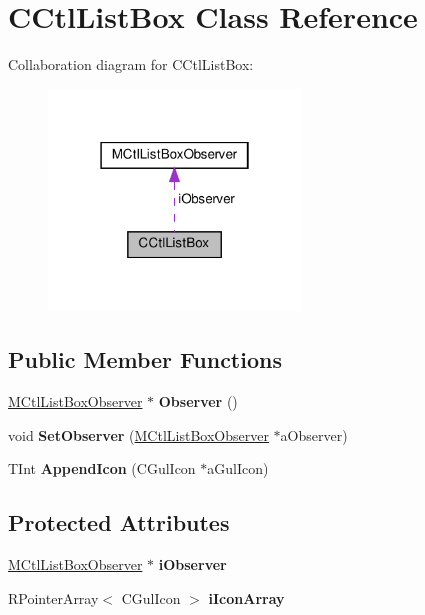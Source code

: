 \hypertarget{classCCtlListBox}{}\section{C\+Ctl\+List\+Box Class Reference}
\label{classCCtlListBox}


Collaboration diagram for C\+Ctl\+List\+Box\+:
\nopagebreak
\begin{figure}[H]
\begin{center}
\leavevmode
\includegraphics[width=190pt]{classCCtlListBox__coll__graph}
\end{center}
\end{figure}
\subsection*{Public Member Functions}
\begin{DoxyCompactItemize}
\item 
\mbox{\label{classCCtlListBox_a3d64c3d1fd6826c3a8a55f617cda6904}} 
\hyperlink{classMCtlListBoxObserver}{M\+Ctl\+List\+Box\+Observer} $\ast$ {\bfseries Observer} ()
\item 
\mbox{\label{classCCtlListBox_a86982ba163f5a2514b44a7709ffa3dc3}} 
void {\bfseries Set\+Observer} (\hyperlink{classMCtlListBoxObserver}{M\+Ctl\+List\+Box\+Observer} $\ast$a\+Observer)
\item 
\mbox{\label{classCCtlListBox_aec654fe85618626641637761d3d7d862}} 
T\+Int {\bfseries Append\+Icon} (C\+Gul\+Icon $\ast$a\+Gul\+Icon)
\end{DoxyCompactItemize}
\subsection*{Protected Attributes}
\begin{DoxyCompactItemize}
\item 
\mbox{\label{classCCtlListBox_ac5ee8c1b8996be8d5382b2d187925811}} 
\hyperlink{classMCtlListBoxObserver}{M\+Ctl\+List\+Box\+Observer} $\ast$ {\bfseries i\+Observer}
\item 
\mbox{\label{classCCtlListBox_a4a936e5121611964ac32c7e79723bc57}} 
R\+Pointer\+Array$<$ C\+Gul\+Icon $>$ {\bfseries i\+Icon\+Array}
\end{DoxyCompactItemize}


